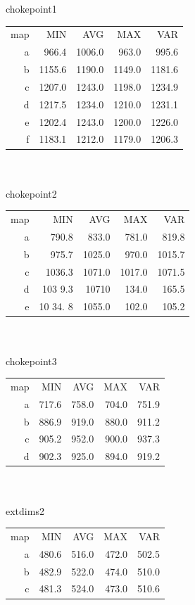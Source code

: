 \documentclass[12pt,letterpaper]{article}
\begin{document}
chokepoint1
\begin{tabular}{ r | r | r | r | r }
map & MIN  & AVG    & MAX    & VAR    \\
a &  966.4 & 1006.0 &  963.0 &  995.6 \\
b & 1155.6 & 1190.0 & 1149.0 & 1181.6 \\
c & 1207.0 & 1243.0 & 1198.0 & 1234.9 \\
d & 1217.5 & 1234.0 & 1210.0 & 1231.1 \\
e & 1202.4 & 1243.0 & 1200.0 & 1226.0 \\
f & 1183.1 & 1212.0 & 1179.0 & 1206.3 \\
\end{tabular}
\\
\\
chokepoint2
\begin{tabular}{ r | r | r | r | r }
map & MIN  & AVG    & MAX    & VAR    \\
a &  790.8 &  833.0 &  781.0 &  819.8 \\
b &  975.7 & 1025.0 &  970.0 & 1015.7 \\
c & 1036.3 & 1071.0 & 1017.0 & 1071.5 \\
d &  103 9.3 & 10710 & 134.0 & 165.5 \\
e & 10 34. 8 & 1055.0& 102.0 & 105.2 \\  
\end{tabular}
\\
\\
chokepoint3
\begin{tabular}{ r | r | r | r | r }
map &  MIN   & AVG   & MAX   & VAR   \\
a   &  717.6 & 758.0 & 704.0 & 751.9 \\
b   &  886.9 & 919.0 & 880.0 & 911.2 \\
c   &  905.2 & 952.0 & 900.0 & 937.3 \\
d   &  902.3 & 925.0 & 894.0 & 919.2 \\
\end{tabular}          
\\  
\\
extdims2
\begin{tabular}{ r | r | r | r | r }
map & MIN   & AVG   & MAX   & VAR   \\
a   & 480.6 & 516.0 & 472.0 & 502.5 \\
b   & 482.9 & 522.0 & 474.0 & 510.0 \\
c   & 481.3 & 524.0 & 473.0 & 510.6 \\
\end{tabular}                          
\end{document}
